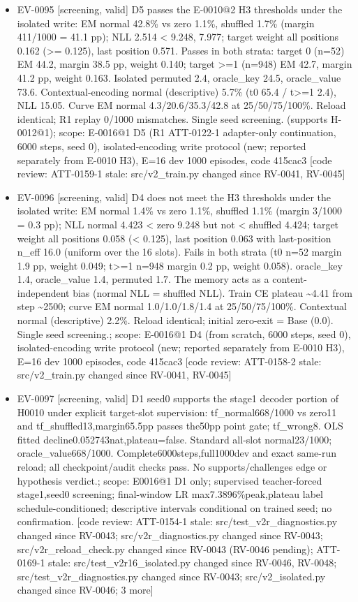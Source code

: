 \documentclass[11pt]{article}
\begin{document}
\begin{itemize}
\item EV-0095 [screening, valid] D5 passes the E-0010@2 H3 thresholds under the isolated write: EM normal 42.8\% vs zero 1.1\%, shuffled 1.7\% (margin 411/1000 = 41.1 pp); NLL 2.514 \textless{} 9.248, 7.977; target weight all positions 0.162 (\textgreater{}= 0.125), last position 0.571. Passes in both strata: target 0 (n=52) EM 44.2, margin 38.5 pp, weight 0.140; target \textgreater{}=1 (n=948) EM 42.7, margin 41.2 pp, weight 0.163. Isolated permuted 2.4, oracle\_key 24.5, oracle\_value 73.6. Contextual-encoding normal (descriptive) 5.7\% (t0 65.4 / t\textgreater{}=1 2.4), NLL 15.05. Curve EM normal 4.3/20.6/35.3/42.8 at 25/50/75/100\%. Reload identical; R1 replay 0/1000 mismatches. Single seed screening. (supports H-0012@1); scope: E-0016@1 D5 (R1 ATT-0122-1 adapter-only continuation, 6000 steps, seed 0), isolated-encoding write protocol (new; reported separately from E-0010 H3), E=16 dev 1000 episodes, code 415cac3 [code review: ATT-0159-1 stale: src/v2\_train.py changed since RV-0041, RV-0045]
\item EV-0096 [screening, valid] D4 does not meet the H3 thresholds under the isolated write: EM normal 1.4\% vs zero 1.1\%, shuffled 1.1\% (margin 3/1000 = 0.3 pp); NLL normal 4.423 \textless{} zero 9.248 but not \textless{} shuffled 4.424; target weight all positions 0.058 (\textless{} 0.125), last position 0.063 with last-position n\_eff 16.0 (uniform over the 16 slots). Fails in both strata (t0 n=52 margin 1.9 pp, weight 0.049; t\textgreater{}=1 n=948 margin 0.2 pp, weight 0.058). oracle\_key 1.4, oracle\_value 1.4, permuted 1.7. The memory acts as a content-independent bias (normal NLL = shuffled NLL). Train CE plateau \textasciitilde{}4.41 from step \textasciitilde{}2500; curve EM normal 1.0/1.0/1.8/1.4 at 25/50/75/100\%. Contextual normal (descriptive) 2.2\%. Reload identical; initial zero-exit = Base (0.0). Single seed screening.; scope: E-0016@1 D4 (from scratch, 6000 steps, seed 0), isolated-encoding write protocol (new; reported separately from E-0010 H3), E=16 dev 1000 episodes, code 415cac3 [code review: ATT-0158-2 stale: src/v2\_train.py changed since RV-0041, RV-0045]
\item EV-0097 [screening, valid] D1 seed0 supports the stage1 decoder portion of H0010 under explicit target-slot supervision: tf\_normal668/1000 vs zero11 and tf\_shuffled13,margin65.5pp passes the50pp point gate; tf\_wrong8. OLS fitted decline0.052743nat,plateau=false. Standard all-slot normal23/1000; oracle\_value668/1000. Complete6000steps,full1000dev and exact same-run reload; all checkpoint/audit checks pass. No supports/challenges edge or hypothesis verdict.; scope: E0016@1 D1 only; supervised teacher-forced stage1,seed0 screening; final-window LR max7.3896\%peak,plateau label schedule-conditioned; descriptive intervals conditional on trained seed; no confirmation. [code review: ATT-0154-1 stale: src/test\_v2r\_diagnostics.py changed since RV-0043; src/v2r\_diagnostics.py changed since RV-0043; src/v2r\_reload\_check.py changed since RV-0043 (RV-0046 pending); ATT-0169-1 stale: src/test\_v2r16\_isolated.py changed since RV-0046, RV-0048; src/test\_v2r\_diagnostics.py changed since RV-0043; src/v2\_isolated.py changed since RV-0046; 3 more]

\end{itemize}
\end{document}
